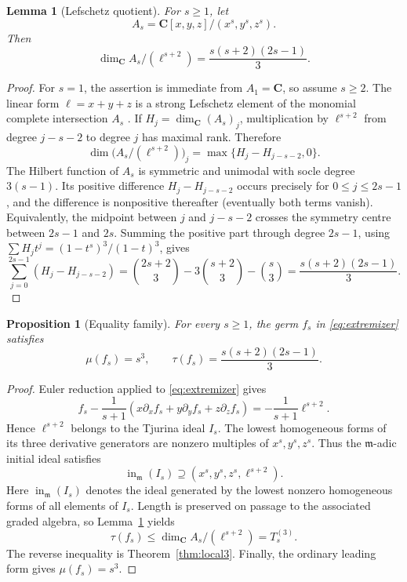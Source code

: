 \documentclass[11pt]{article}
\newtheorem{proposition}[theorem]{Proposition}
\newtheorem{lemma}[theorem]{Lemma}
\theoremstyle{remark}
\newcommand{\m}{\mathfrak m}
\begin{document}
\begin{lemma}[Lefschetz quotient]\label{lem:lefschetz}
For \(s\ge1\), let
\[
 A_s=\mathbf C[x,y,z]/(x^s,y^s,z^s).
\]
Then
\[
 \dim_{\mathbf C} A_s/(\ell^{s+2})
 =\frac{s(s+2)(2s-1)}3.
\]
\end{lemma}

\begin{proof}
For \(s=1\), the assertion is immediate from \(A_1=\mathbf C\), so assume
\(s\ge2\).
The linear form \(\ell=x+y+z\) is a strong Lefschetz element of the
monomial complete intersection \(A_s\)
\cite{Stanley1980,PhuongTran2023}.  If \(H_j=\dim_{\mathbf C}(A_s)_j\),
multiplication by \(\ell^{s+2}\) from degree \(j-s-2\) to degree \(j\)
has maximal rank.  Therefore
\[
 \dim\bigl(A_s/(\ell^{s+2})\bigr)_j
 =\max\{H_j-H_{j-s-2},0\}.
\]
The Hilbert function of \(A_s\) is symmetric and unimodal with socle degree
\(3(s-1)\).  Its positive difference
\(H_j-H_{j-s-2}\) occurs precisely for \(0\le j\le2s-1\), and the
difference is nonpositive thereafter (eventually both terms vanish).
Equivalently, the midpoint between \(j\) and \(j-s-2\) crosses the symmetry
centre between \(2s-1\) and \(2s\).  Summing the positive part through degree
\(2s-1\), using
\(\sum H_jt^j=(1-t^s)^3/(1-t)^3\), gives
\[
 \sum_{j=0}^{2s-1}(H_j-H_{j-s-2})
 =\binom{2s+2}{3}-3\binom{s+2}{3}-\binom{s}{3}
 =\frac{s(s+2)(2s-1)}3.
\]
\end{proof}

\begin{proposition}[Equality family]\label{prop:equality}
For every \(s\ge1\), the germ \(f_s\) in \eqref{eq:extremizer} satisfies
\[
 \mu(f_s)=s^3,
 \qquad
 \tau(f_s)=\frac{s(s+2)(2s-1)}3.
\]
\end{proposition}

\begin{proof}
Euler reduction applied to \eqref{eq:extremizer} gives
\[
 f_s-\frac1{s+1}(x\partial_xf_s+y\partial_yf_s+z\partial_zf_s)
 =-\frac1{s+1}\ell^{s+2}.
\]
Hence \(\ell^{s+2}\) belongs to the Tjurina ideal \(I_s\).  The lowest
homogeneous forms of its three derivative generators are nonzero multiples
of \(x^s,y^s,z^s\).  Thus the \(\m\)-adic initial ideal satisfies
\[
 \operatorname{in}_{\m}(I_s)
 \supseteq (x^s,y^s,z^s,\ell^{s+2}).
\]
Here \(\operatorname{in}_{\m}(I_s)\) denotes the ideal generated by the
lowest nonzero homogeneous forms of all elements of \(I_s\).  Length is
preserved on passage to the associated graded algebra, so
Lemma~\ref{lem:lefschetz} yields
\[
 \tau(f_s)\le\dim_{\mathbf C}A_s/(\ell^{s+2})=T^{(3)}_s.
\]
The reverse inequality is Theorem~\ref{thm:local3}.  Finally, the ordinary
leading form gives \(\mu(f_s)=s^3\).
\end{proof}
\end{document}
